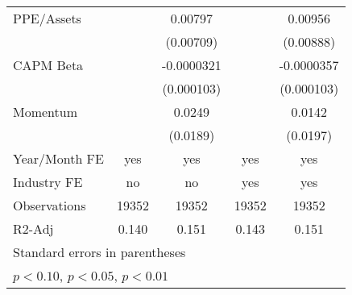 {\begin{tabular}{l*{4}{c}}
PPE/Assets          &                     &     0.00797         &                     &     0.00956         \\
                    &                     &   (0.00709)         &                     &   (0.00888)         \\
CAPM Beta           &                     &  -0.0000321         &                     &  -0.0000357         \\
                    &                     &  (0.000103)         &                     &  (0.000103)         \\
Momentum            &                     &      0.0249         &                     &      0.0142         \\
                    &                     &    (0.0189)         &                     &    (0.0197)         \\
\hline
Year/Month FE       &         yes         &         yes         &         yes         &         yes         \\
Industry FE         &          no         &          no         &         yes         &         yes         \\
Observations        &       19352         &       19352         &       19352         &       19352         \\
R2-Adj              &       0.140         &       0.151         &       0.143         &       0.151         \\
\hline\hline
\multicolumn{5}{l}{\footnotesize Standard errors in parentheses}\\
\multicolumn{5}{l}{\footnotesize \sym{*} \(p<0.10\), \sym{**} \(p<0.05\), \sym{***} \(p<0.01\)}\\
\end{tabular}
}
